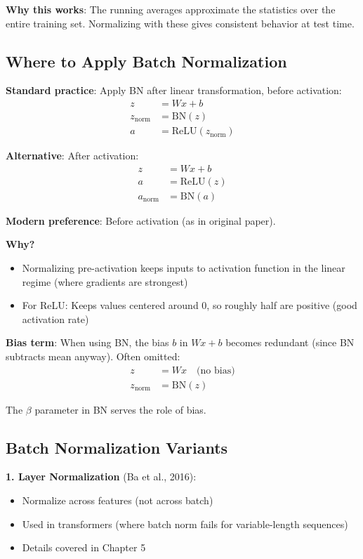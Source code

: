 \textbf{Why this works}: The running averages approximate the statistics over the entire training set. Normalizing with these gives consistent behavior at test time.

\subsection{Where to Apply Batch Normalization}

\textbf{Standard practice}: Apply BN after linear transformation, before activation:
\begin{align*}
z &= Wx + b \\
z_{\text{norm}} &= \text{BN}(z) \\
a &= \text{ReLU}(z_{\text{norm}})
\end{align*}

\textbf{Alternative}: After activation:
\begin{align*}
z &= Wx + b \\
a &= \text{ReLU}(z) \\
a_{\text{norm}} &= \text{BN}(a)
\end{align*}

\textbf{Modern preference}: Before activation (as in original paper).

\textbf{Why?}
\begin{itemize}
\item Normalizing pre-activation keeps inputs to activation function in the linear regime (where gradients are strongest)
\item For ReLU: Keeps values centered around 0, so roughly half are positive (good activation rate)
\end{itemize}

\textbf{Bias term}: When using BN, the bias $b$ in $Wx + b$ becomes redundant (since BN subtracts mean anyway). Often omitted:
\begin{align*}
z &= Wx \quad \text{(no bias)} \\
z_{\text{norm}} &= \text{BN}(z)
\end{align*}

The $\beta$ parameter in BN serves the role of bias.

\subsection{Batch Normalization Variants}

\textbf{1. Layer Normalization} (Ba et al., 2016):
\begin{itemize}
\item Normalize across features (not across batch)
\item Used in transformers (where batch norm fails for variable-length sequences)
\item Details covered in Chapter 5
\end{itemize}


